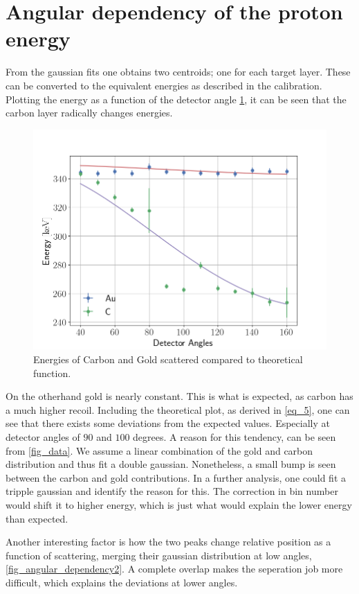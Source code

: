 \section{Angular dependency of the proton energy}
From the gaussian fits one obtains two centroids; one for each target layer. These can be converted to the equivalent energies as described in the calibration. Plotting the energy as a function of the detector angle \cref{fig_energy}, it can be seen that the carbon layer radically changes energies.\\
\begin{figure}[h!]
\centering
\includegraphics[width=0.99\columnwidth]{fig_energy}
\caption{Energies of Carbon and Gold scattered compared to theoretical
function.}
\label{fig_energy}
\end{figure}

On the otherhand gold is nearly constant. This is what is expected, as carbon has a much higher recoil. Including the theoretical plot, as derived in \cref{eq_5}, one can see that there exists some deviations from the expected values. Especially at detector angles of $90$ and $100$ degrees.
A reason for this tendency, can be seen from \cref{fig_data}. We assume a linear combination of the gold and carbon distribution and thus fit a double gaussian. Nonetheless, a small bump is seen between the carbon and gold contributions. In a further analysis, one could fit a tripple gaussian and identify the reason for this. The correction in bin number would shift it to higher energy, which is just what would explain the lower energy than expected.

Another interesting factor is how the two peaks change relative position as a
function of scattering, merging their gaussian distribution at low angles, \cref{fig_angular_dependency2}. A complete overlap makes the seperation job more difficult, which explains the deviations at lower angles.


